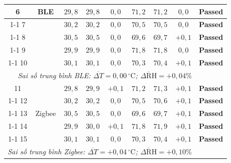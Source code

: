\begin{longtable}{|c|c|c|c|c|c|c|c|c|}
            6 & \multirow{5}{*}{BLE} & $29{,}8$ & $29{,}8$ & $0{,}0$ & $71{,}2$ & $71{,}2$ & $0{,}0$ & \textcolor{modern_blue}{\textbf{Passed}} \\ \cline{1-1}\cline{3-9}
            7 & & $30{,}2$ & $30{,}2$ & $0{,}0$ & $70{,}5$ & $70{,}5$ & $0{,}0$ & \textcolor{modern_blue}{\textbf{Passed}} \\ \cline{1-1}\cline{3-9}
            8 & & $30{,}5$ & $30{,}5$ & $0{,}0$ & $69{,}6$ & $69{,}7$ & $+0{,}1$ & \textcolor{modern_blue}{\textbf{Passed}} \\ \cline{1-1}\cline{3-9}
            9 & & $29{,}9$ & $29{,}9$ & $0{,}0$ & $71{,}8$ & $71{,}8$ & $0{,}0$ & \textcolor{modern_blue}{\textbf{Passed}} \\ \cline{1-1}\cline{3-9}
            10 & & $30{,}1$ & $30{,}1$ & $0{,}0$ & $70{,}3$ & $70{,}4$ & $+0{,}1$ & \textcolor{modern_blue}{\textbf{Passed}} \\ \hline

            \multicolumn{8}{|r|}{\textit{Sai số trung bình BLE: $\overline{\Delta T} = 0{,}00\,{^\circ}\text{C}$; $\overline{\Delta \text{RH}} = +0{,}04\%$}} & \\ \hline

            11 & \multirow{5}{*}{Zigbee} & $29{,}8$ & $29{,}9$ & $+0{,}1$ & $71{,}2$ & $71{,}3$ & $+0{,}1$ & \textcolor{modern_blue}{\textbf{Passed}} \\ \cline{1-1}\cline{3-9}
            12 & & $30{,}2$ & $30{,}2$ & $0{,}0$ & $70{,}5$ & $70{,}6$ & $+0{,}1$ & \textcolor{modern_blue}{\textbf{Passed}} \\ \cline{1-1}\cline{3-9}
            13 & & $30{,}5$ & $30{,}5$ & $0{,}0$ & $69{,}6$ & $69{,}7$ & $+0{,}1$ & \textcolor{modern_blue}{\textbf{Passed}} \\ \cline{1-1}\cline{3-9}
            14 & & $29{,}9$ & $30{,}0$ & $+0{,}1$ & $71{,}8$ & $71{,}9$ & $+0{,}1$ & \textcolor{modern_blue}{\textbf{Passed}} \\ \cline{1-1}\cline{3-9}
            15 & & $30{,}1$ & $30{,}1$ & $0{,}0$ & $70{,}3$ & $70{,}4$ & $+0{,}1$ & \textcolor{modern_blue}{\textbf{Passed}} \\ \hline

            \multicolumn{8}{|r|}{\textit{Sai số trung bình Zigbee: $\overline{\Delta T} = +0{,}04\,{^\circ}\text{C}$; $\overline{\Delta \text{RH}} = +0{,}10\%$}} & \\ \hline
        \end{longtable}

